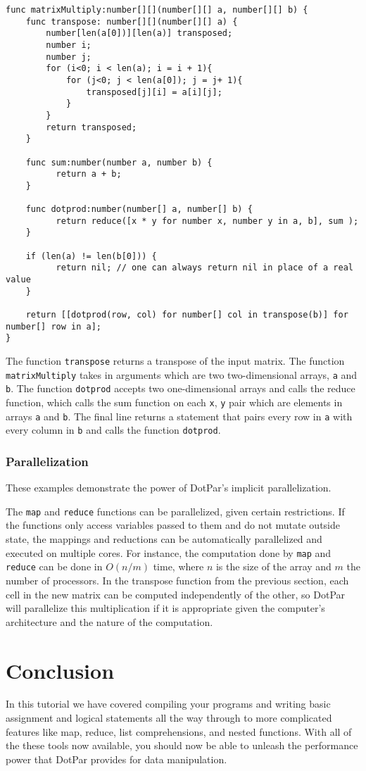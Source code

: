 \documentclass{article}
\begin{document}
\begin{verbatim}
func matrixMultiply:number[][](number[][] a, number[][] b) {
    func transpose: number[][](number[][] a) {
        number[len(a[0])][len(a)] transposed;
        number i;
        number j;
        for (i<0; i < len(a); i = i + 1){
            for (j<0; j < len(a[0]); j = j+ 1){
                transposed[j][i] = a[i][j];
            }
        }
        return transposed;
    }

    func sum:number(number a, number b) {
          return a + b;
    }
    
    func dotprod:number(number[] a, number[] b) {
          return reduce([x * y for number x, number y in a, b], sum );
    }
    
    if (len(a) != len(b[0])) {
          return nil; // one can always return nil in place of a real value
    }
    
    return [[dotprod(row, col) for number[] col in transpose(b)] for number[] row in a];
}
\end{verbatim}

The function \verb=transpose= returns a transpose of the input matrix. The function \verb=matrixMultiply= takes in arguments which are two two-dimensional arrays, \verb=a= and \verb=b=. The function \verb=dotprod= accepts two one-dimensional arrays and calls the reduce function, which calls the sum function on each \verb=x=, \verb=y= pair which are elements in arrays \verb=a= and \verb=b=. The final line returns a statement that pairs every row in \verb=a= with every column in \verb=b= and calls the function \verb=dotprod=.

\subsubsection{Parallelization}
These examples demonstrate the power of DotPar's implicit parallelization.

The \verb=map= and \verb=reduce= functions can be parallelized, given certain restrictions. If the functions only access variables passed to them and do not mutate outside state, the mappings and reductions can be automatically parallelized and executed on multiple cores. For instance, the computation done by \verb=map= and \verb=reduce= can be done in $O(n/m)$ time, where $n$ is the size of the array and $m$ the number of processors. In the transpose function from the previous section, each cell in the new matrix can be computed independently of the other, so DotPar will parallelize this multiplication if it is appropriate given the computer's architecture and the nature of the computation.

\section{Conclusion}
In this tutorial we have covered compiling your programs and writing basic assignment and logical statements all the way through to more complicated features like map, reduce, list comprehensions, and nested functions. With all of the these tools now available, you should now be able to unleash the performance power that DotPar provides for data manipulation.
\end{document}
